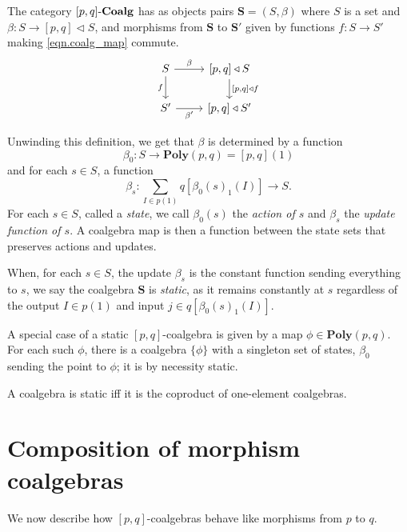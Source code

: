 \documentclass[11pt, one side, article]{memoir}
\theoremstyle{definition}
\theoremstyle{plain}
\newenvironment{example}
  {\pushQED{\qed}\renewcommand{\qedsymbol}{$\lozenge$}\examplex}
  {\popQED\endexamplex}
\newenvironment{definition}
  {\pushQED{\qed}\renewcommand{\qedsymbol}{$\lozenge$}\definitionx}
  {\popQED\enddefinitionx}
\newcommand{\Cat}[1]{\mathbf{#1}}%
\newcommand{\tn}[1]{\textnormal{#1}}
\newcommand{\poly}{\Cat{Poly}}
\newcommand{\0}{\textsf{0}}
\newcommand{\1}{\tn{\textsf{1}}}
\newcommand{\tri}{\mathbin{\triangleleft}}
\newcommand{\coalg}{\tn{-}\Cat{Coalg}}
\renewcommand{\S}{{\Cat{S}}}
\newcommand{\dnote}[1]{{\color{blue}David says:}~#1.\quad{\color{blue}$\lozenge$}}
\begin{document}
\begin{definition}
The category $[p,q]\coalg$ has as objects pairs $\S = (S,\beta)$ where $S$ is a set and $\beta : S \to [p,q] \tri S$, and morphisms from $\S$ to $\S'$ given by functions $f : S \to S'$ making \eqref{eqn.coalg_map} commute. 
\begin{equation}\label{eqn.coalg_map}
\begin{tikzcd}
S \rar{\beta} \dar[swap]{f} & {[p,q]} \tri S \dar{{[p,q]} \tri f} \\
S' \rar[swap]{\beta'} & {[p,q]} \tri S'
\end{tikzcd}
\end{equation}
\end{definition}

Unwinding this definition, we get that $\beta$ is determined by a function 
$$\beta_0 : S \to \poly(p,q) = [p,q](1)$$
and for each $s \in S$, a function 
$$\beta_s : \sum_{I \in p(1)} q[\beta_0(s)_1(I)] \to S.$$ 
For each $s \in S$, called a \emph{state}, we call $\beta_0(s)$ the \emph{action of $s$} and $\beta_s$ the \emph{update function of $s$}. A coalgebra map is then a function between the state sets that preserves actions and updates. 

When, for each $s \in S$, the update $\beta_s$ is the constant function sending everything to $s$, we say the coalgebra $\S$ is \emph{static}, as it remains constantly at $s$ regardless of the output $I \in p(1)$ and input $j\in q[\beta_0(s)_1(I)]$.

\begin{example}\label{ex.single_state}
A special case of a static $[p,q]$-coalgebra is given by a map $\phi \in \poly(p,q)$. For each such $\phi$, there is a coalgebra $\{\phi\}$ with a singleton set of states, $\beta_0$ sending the point to $\phi$; it is by necessity static. 

A coalgebra is static iff it is the coproduct of one-element coalgebras.
\end{example}



\section{Composition of morphism coalgebras}



We now describe how $[p,q]$-coalgebras behave like morphisms from $p$ to $q$.
\end{document}
